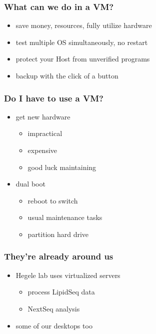 \documentclass{beamer}
\begin{document}
\begin{frame}
    \frametitle{What can we do in a VM?}
    \begin{itemize}
        \item save money, resources, fully utilize hardware
        \item test multiple OS simultaneously, no restart
        \item protect your Host from unverified programs
        \item backup with the click of a button
    \end{itemize}
\end{frame}

\begin{frame}
    \frametitle{Do I have to use a VM?}
    \begin{itemize}
        \item get new hardware
            \begin{itemize}
                \item impractical
                \item expensive
                \item good luck maintaining
            \end{itemize}
        \item dual boot
            \begin{itemize}
                \item reboot to switch
                \item usual maintenance tasks
                \item partition hard drive
            \end{itemize}
    \end{itemize}
\end{frame}

\begin{frame}
    \frametitle{They're already around us}
    \begin{itemize}
        \item Hegele lab uses virtualized servers
            \begin{itemize}
                \item process LipidSeq data
                \item NextSeq analysis 
            \end{itemize}
        \item some of our desktops too
    \end{itemize}
\end{frame}
\end{document}
